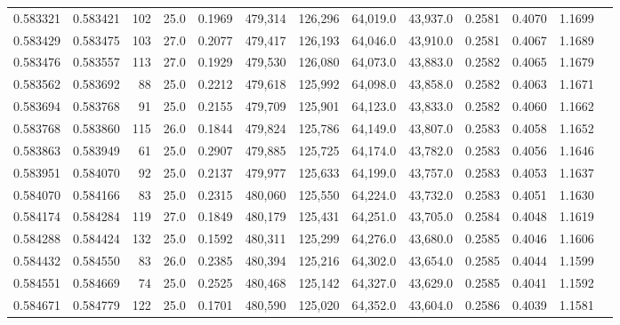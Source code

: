 \begin{tabular}{rrrrrrrrrrrrr}
0.583321 & 0.583421 &   102 & 25.0 &                                     0.1969 & 479,314 & 126,296 &  64,019.0 &  43,937.0 & 0.2581 & 0.4070 & 1.1699 \\
0.583429 & 0.583475 &   103 & 27.0 &                                     0.2077 & 479,417 & 126,193 &  64,046.0 &  43,910.0 & 0.2581 & 0.4067 & 1.1689 \\
0.583476 & 0.583557 &   113 & 27.0 &                                     0.1929 & 479,530 & 126,080 &  64,073.0 &  43,883.0 & 0.2582 & 0.4065 & 1.1679 \\
0.583562 & 0.583692 &    88 & 25.0 &                                     0.2212 & 479,618 & 125,992 &  64,098.0 &  43,858.0 & 0.2582 & 0.4063 & 1.1671 \\
0.583694 & 0.583768 &    91 & 25.0 &                                     0.2155 & 479,709 & 125,901 &  64,123.0 &  43,833.0 & 0.2582 & 0.4060 & 1.1662 \\
0.583768 & 0.583860 &   115 & 26.0 &                                     0.1844 & 479,824 & 125,786 &  64,149.0 &  43,807.0 & 0.2583 & 0.4058 & 1.1652 \\
0.583863 & 0.583949 &    61 & 25.0 &                                     0.2907 & 479,885 & 125,725 &  64,174.0 &  43,782.0 & 0.2583 & 0.4056 & 1.1646 \\
0.583951 & 0.584070 &    92 & 25.0 &                                     0.2137 & 479,977 & 125,633 &  64,199.0 &  43,757.0 & 0.2583 & 0.4053 & 1.1637 \\
0.584070 & 0.584166 &    83 & 25.0 &                                     0.2315 & 480,060 & 125,550 &  64,224.0 &  43,732.0 & 0.2583 & 0.4051 & 1.1630 \\
0.584174 & 0.584284 &   119 & 27.0 &                                     0.1849 & 480,179 & 125,431 &  64,251.0 &  43,705.0 & 0.2584 & 0.4048 & 1.1619 \\
0.584288 & 0.584424 &   132 & 25.0 &                                     0.1592 & 480,311 & 125,299 &  64,276.0 &  43,680.0 & 0.2585 & 0.4046 & 1.1606 \\
0.584432 & 0.584550 &    83 & 26.0 &                                     0.2385 & 480,394 & 125,216 &  64,302.0 &  43,654.0 & 0.2585 & 0.4044 & 1.1599 \\
0.584551 & 0.584669 &    74 & 25.0 &                                     0.2525 & 480,468 & 125,142 &  64,327.0 &  43,629.0 & 0.2585 & 0.4041 & 1.1592 \\
0.584671 & 0.584779 &   122 & 25.0 &                                     0.1701 & 480,590 & 125,020 &  64,352.0 &  43,604.0 & 0.2586 & 0.4039 & 1.1581 \\

\end{tabular}
